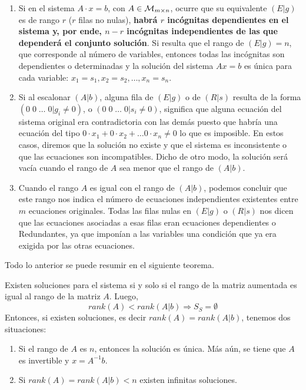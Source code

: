 \begin{rmk}
\begin{enumerate}
    \item Si en el sistema $A·x = b$, con $A\in\mathcal{M}_{m\times n}$, ocurre que su equivalente $(E| g)$ es de rango
$r$ ($r$ filas no nulas), \textbf{habrá $r$ incógnitas dependientes en el sistema y, por ende, $n - r$ incógnitas independientes de las que dependerá el conjunto solución}.
Si resulta que el rango de $(E| g) = n$, que corresponde al n\'umero de variables, entonces todas las incógnitas son
dependientes o determinadas y la solución del sistema $Ax = b$ es única para cada
variable: $x_1= s_1, x_2= s_2, \dots , x_n = s_n$.
\item Si al escalonar $(A| b)$, alguna fila de $(E| g)$ o de $(R| s)$ resulta de la
forma $(0\; 0\; \dots\; 0| g_i \neq 0)$, o $(0\; 0 \;\dots\; 0| s_i \neq 0)$, significa que alguna ecuación del sistema original era contradictoria con las demás puesto que habría una ecuación del tipo $0·x_1 + 0·x_2 + \dots 0·x_n \neq 0$ lo que es imposible. En estos casos, diremos que la solución no existe y que el sistema es
inconsistente o que las ecuaciones son incompatibles. Dicho de otro modo,
la solución será vacía cuando el rango de $A$ sea menor que el rango de $(A|
b)$.
\item Cuando el rango $A$ es igual con el rango de $(A| b)$, podemos concluir que este rango nos indica el número de ecuaciones independientes existentes entre $m$ ecuaciones originales. Todas las filas nulas en $(E| g)$ o $(R| s)$ nos dicen que las ecuaciones asociadas a esas filas eran ecuaciones dependientes o Redundantes, ya que imponían a las variables una condición que ya era exigida por las otras ecuaciones.
\end{enumerate}
Todo lo anterior se puede resumir en el siguiente teorema.
\begin{thm}
Existen soluciones para el sistema si y solo si el rango de la matriz aumentada es igual al rango de la matriz $A$.
Luego,
\[rank(A) < rank(A|b)\Longrightarrow S_S = \emptyset\]
Entonces, si existen soluciones, es decir $rank(A) = rank(A|b)$, tenemos dos situaciones:
\begin{enumerate}
    \item Si el rango de $A$ es $n$, entonces la solución es única. M\'as a\'un, se tiene que $A$ es invertible y $x = A^{-1}b$.
    \item Si $rank(A) = rank(A|b)<n$ existen infinitas soluciones.
\end{enumerate}
\end{thm}


\end{rmk}


